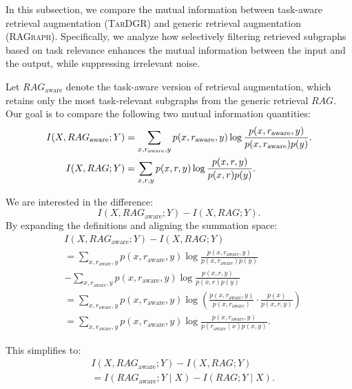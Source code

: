 \documentclass[letterpaper]{article} %
\begin{document}
In this subsection, we compare the mutual information between task-aware retrieval augmentation (\textsc{TarDGR}) and generic retrieval augmentation (\textsc{RAGraph}). Specifically, we analyze how selectively filtering retrieved subgraphs based on task relevance enhances the mutual information between the input and the output, while suppressing irrelevant noise.

Let $RAG_{\text{aware}}$ denote the task-aware version of retrieval augmentation, which retains only the most task-relevant subgraphs from the generic retrieval $RAG$. Our goal is to compare the following two mutual information quantities:
\begin{align}
\small
I(X, RAG_{\text{aware}}; Y) &= \sum_{x, r_{\text{aware}}, y} p(x, r_{\text{aware}}, y) \log \frac{p(x, r_{\text{aware}}, y)}{p(x, r_{\text{aware}}) p(y)}. \\
I(X, RAG; Y) &= \sum_{x, r, y} p(x, r, y) \log \frac{p(x, r, y)}{p(x, r) p(y)}.
\end{align}

We are interested in the difference:
\begin{equation}
I(X, RAG_{\text{aware}}; Y) - I(X, RAG; Y).
\end{equation}
By expanding the definitions and aligning the summation space:
\begin{equation}
\begin{aligned}
&I(X, RAG_{\text{aware}}; Y) - I(X, RAG; Y) \\
&= \sum_{x, r_{\text{aware}}, y} p(x, r_{\text{aware}}, y) \log \frac{p(x, r_{\text{aware}}, y)}{p(x, r_{\text{aware}}) p(y)}
\\&- \sum_{x, r_{\text{aware}}, y} p(x, r_{\text{aware}}, y) \log \frac{p(x, r, y)}{p(x, r) p(y)} \\
&= \sum_{x, r_{\text{aware}}, y} p(x, r_{\text{aware}}, y) \log \left(
\frac{p(x, r_{\text{aware}}, y)}{p(x, r_{\text{aware}})} \cdot \frac{p(x)}{p(x, r, y)}
\right) \\
&= \sum_{x, r_{\text{aware}}, y} p(x, r_{\text{aware}}, y) \log \frac{p(x, r_{\text{aware}}, y)}{p(r_{\text{aware}} \mid x) p(x, y)}.
\end{aligned}
\end{equation}

This simplifies to:
\begin{equation}
\begin{aligned}
&I(X, RAG_{\text{aware}}; Y) - I(X, RAG; Y) \\
&= I(RAG_{\text{aware}}; Y \mid X) - I(RAG; Y \mid X).
\end{aligned}
\end{equation}
\end{document}
